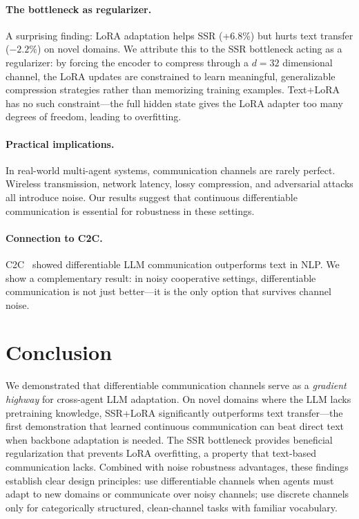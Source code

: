\documentclass[11pt,a4paper]{article}
\begin{document}
\paragraph{The bottleneck as regularizer.}
A surprising finding: LoRA adaptation helps SSR (+6.8\%) but hurts text transfer ($-2.2\%$) on novel domains. We attribute this to the SSR bottleneck acting as a regularizer: by forcing the encoder to compress through a $d{=}32$ dimensional channel, the LoRA updates are constrained to learn meaningful, generalizable compression strategies rather than memorizing training examples. Text+LoRA has no such constraint---the full hidden state gives the LoRA adapter too many degrees of freedom, leading to overfitting.

\paragraph{Practical implications.}
In real-world multi-agent systems, communication channels are rarely perfect. Wireless transmission, network latency, lossy compression, and adversarial attacks all introduce noise. Our results suggest that continuous differentiable communication is essential for robustness in these settings.

\paragraph{Connection to C2C.}
C2C~\cite{fan2026c2c} showed differentiable LLM communication outperforms text in NLP. We show a complementary result: in noisy cooperative settings, differentiable communication is not just better---it is the only option that survives channel noise.

\section{Conclusion}

We demonstrated that differentiable communication channels serve as a \emph{gradient highway} for cross-agent LLM adaptation. On novel domains where the LLM lacks pretraining knowledge, SSR+LoRA significantly outperforms text transfer---the first demonstration that learned continuous communication can beat direct text when backbone adaptation is needed. The SSR bottleneck provides beneficial regularization that prevents LoRA overfitting, a property that text-based communication lacks. Combined with noise robustness advantages, these findings establish clear design principles: use differentiable channels when agents must adapt to new domains or communicate over noisy channels; use discrete channels only for categorically structured, clean-channel tasks with familiar vocabulary.
\end{document}
